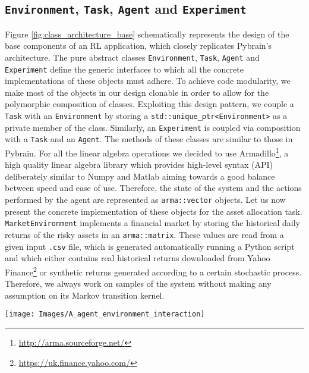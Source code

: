 \subsection{\lstinline{Environment}, \lstinline{Task}, \lstinline{Agent} and \lstinline{Experiment}}
Figure \ref{fig:class_architecture_base} schematically represents the design of the base components of an \gls{RL} application, which closely replicates Pybrain's architecture. The pure abstract classes \lstinline{Environment}, \lstinline{Task}, \lstinline{Agent} and \lstinline{Experiment} define the generic interfaces to which all the concrete implementations of these objects must adhere. To achieve code modularity, we make most of the objects in our design clonable in order to allow for the polymorphic composition of classes. Exploiting this design pattern, we couple a \lstinline{Task} with an \lstinline{Environment} by storing a \lstinline{std::unique_ptr<Environment>} as a private member of the class. Similarly, an \lstinline{Experiment} is coupled via composition with a \lstinline{Task} and an \lstinline{Agent}. The methods of these classes are similar to those in Pybrain. For all the linear algebra operations we decided to use Armadillo\footnote{\url{http://arma.sourceforge.net/}}, a high quality linear algebra library which provides high-level syntax (API) deliberately similar to Numpy and Matlab aiming towards a good balance between speed and ease of use. Therefore, the state of the system and the actions performed by the agent are represented as \lstinline{arma::vector} objects. Let us now present the concrete implementation of these objects for the asset allocation task. \lstinline{MarketEnvironment} implements a financial market by storing the historical daily returns of the risky assets in an \lstinline{arma::matrix}. These values are read from a given input \lstinline{.csv} file, which is generated automatically running a Python script and which either contains real historical returns downloaded from Yahoo Finance\footnote{\url{https://uk.finance.yahoo.com/}} or synthetic returns generated according to a certain stochastic process. Therefore, we always work on samples of the system without making any assumption on its Markov transition kernel.
\begin{sidewaysfigure}[h!]
    \texttt{[image: Images/A\_agent\_environment\_interaction]}
    \caption[Class architecture for the asset allocation problem.]{Class architecture for the learning process in the asset allocation problem.}
    \label{fig:class_architecture_base}
\end{sidewaysfigure}
